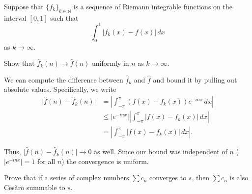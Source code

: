 \documentclass[12 pt, letterpaper]{hmcpset}
\begin{document}
\pagebreak

\begin{problem}[S \& S \S 2.6 \#11.]
	Suppose that $\{ f_{k} \}_{k \in \mathbb{N}}$ is a sequence of Riemann integrable functions on the interval $[0, 1]$ such that
	\[
		\int_{0}^{1} \lvert f_{k}(x) - f(x) \rvert \, dx 
	\]
	as $k \to \infty$.

	Show that $\hat{f}_{k}(n) \to \hat{f}(n)$ uniformly in $n$ as $k \to \infty$.
\end{problem}

\begin{solution}
	We can compute the difference between $\hat{f}_{k}$ and $\hat{f}$ and bound it by pulling out absolute values. Specifically, we write
	\begin{align*}
		\lvert \hat{f}(n) - \hat{f}_{k}(n) \rvert & = \left \lvert \int_{-\pi}^{\pi} (f(x) - f_{k}(x)) e^{-i n x} \, dx  \right \rvert \\
							  & \le \lvert e^{-i n x} \rvert \left \lvert \int_{-\pi}^{\pi} \lvert f(x) - f_{k}(x) \rvert \, dx  \right \rvert \\
							  & = \left \lvert \int_{-\pi}^{\pi} \lvert f(x) - f_{k}(x) \rvert \, dx  \right \rvert.
	\end{align*}

	Thus, $\lvert \hat{f}(n) - \hat{f}_{k}(n) \rvert \to 0$ as well. Since our bound was independent of  $n$ ($\lvert e^{-i n x} \rvert = 1$ for all $n$) the convergence is uniform.
\end{solution}

\pagebreak

\begin{problem}[S \& S \S 2.6 \#12.]
	Prove that if a series of complex numbers $\sum c_{n}$ converges to $s$, then $\sum c_{n}$ is also Ces\`aro summable to $s$.
\end{problem}
\end{document}
